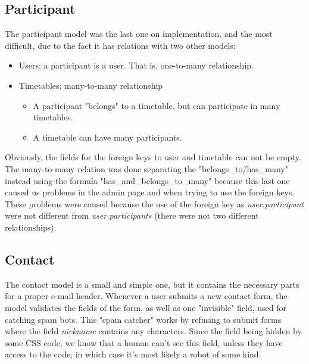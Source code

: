 \subsection{Participant}
\vspace{-5mm}
The participant model was the last one on implementation, and the most difficult, due to the fact it has relations with two other models:
\begin{itemize} \setlength{\itemsep}{-5pt}
\item Users: a participant is a user. That is, one-to-many relationship.
\item Timetables: many-to-many relationship
\begin{itemize} \setlength{\itemsep}{-5pt}
\item A participant "belongs" to a timetable, but can participate in many timetables.
\item A timetable can have many participants.
\end{itemize}
\end{itemize} 
Obviously, the fields for the foreign keys to user and timetable can not be empty.\\
The many-to-many relation was done separating the "belongs\_to/has\_many" instead using the formula "has\_and\_belongs\_to\_many" because this last one caused us problems in the admin page and when trying to use the foreign keys. These problems were caused  because the use of the foreign key as \textit{user.participant} were not different from \textit{user.participants} (there were not two different relationships).
\subsection{Contact}
\vspace{-5mm}
The contact model is a small and simple one, but it contains the necessary parts for a proper e-mail header. 
Whenever a user submits a new contact form, the model validates the fields of the form, as well as one "invisible" field, 
used for catching spam bots. This "spam catcher" works by refusing to submit forms where the field \textit{nickname} 
contains any characters. Since the field being hidden by some CSS code, we know that a human can't see this field, unless they have access to the code, in which case it's most likely a robot of some kind.
 
